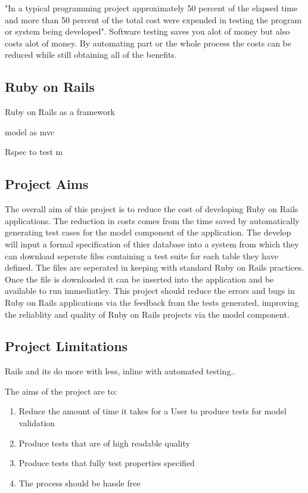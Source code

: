 \documentclass{article}
\begin{document}
\par "In a typical programming project approximately 50 percent of the elapsed time and more than 50 percent of the total cost were expended in testing the program or system being developed"\cite{myers2011art}. Software testing saves you alot of money but also costs alot of money. By automating part or the whole process the costs can be reduced while still obtaining all of the benefits.

\subsection{Ruby on Rails}
\par Ruby on Rails as a framework 
\par model as mvc
\par Rspec to test m

\subsection{Project Aims}
\par The overall aim of this project is to reduce the cost of developing Ruby on Rails applications. The reduction in costs comes from the time saved by automatically generating test cases for the model component of the application. The develop will input a formal specification of thier database into a system from which they can download seperate files containing a test suite for each table they have defined. The files are seperated in keeping with standard Ruby on Rails practices. Once the file is downloaded it can be inserted into the application and be available to run immediatley. This project should reduce the errors and bugs in Ruby on Rails applications via the feedback from the tests generated, improving the reliablity and quality of Ruby on Rails projects via the model component.



\subsection{Project Limitations}

\par Rails and its do more with less, inline with automated testing..

\par The aims of the project are to:
\begin{enumerate}
\item Reduce the amount of time it takes for a User to produce tests for model validation
\item Produce tests that are of high readable quality
\item Produce tests that fully test properties specified
\item The process should be hassle free
\end{enumerate}
\end{document}
